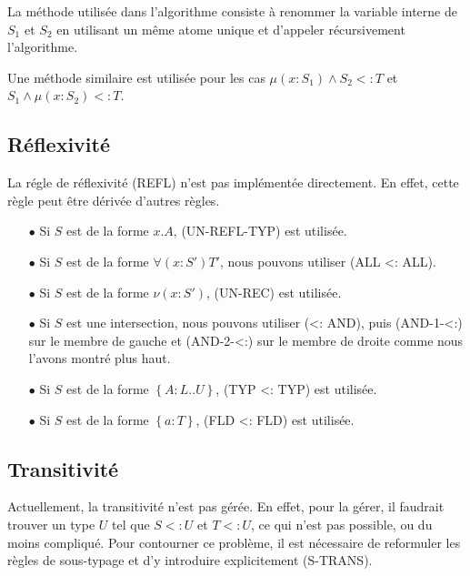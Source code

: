 La méthode utilisée dans l'algorithme consiste à renommer la variable interne de
$S_{1}$ et $S_{2}$ en utilisant un même atome unique et d'appeler récursivement l'algorithme.

Une méthode similaire est utilisée pour les cas $\mu(x : S_{1}) \wedge S_{2} <:
T$ et $S_{1} \wedge \mu(x : S_{2}) <: T$.

\subsection*{Réflexivité}

La régle de réflexivité (REFL) n'est pas implémentée directement. En effet,
cette règle peut être dérivée d'autres règles.

\begin{itemize}
  \item[$\bullet$] Si $S$ est de la forme $x.A$, (UN-REFL-TYP) est utilisée.
  \item[$\bullet$] Si $S$ est de la forme $\forall(x : S') T'$, nous pouvons utiliser (ALL
    <: ALL).
  \item[$\bullet$] Si $S$ est de la forme $\nu(x : S')$, (UN-REC) est utilisée.
  \item[$\bullet$] Si $S$ est une intersection, nous pouvons utiliser (<: AND), puis
    (AND-1-<:) sur le membre de gauche et (AND-2-<:) sur le membre de droite
    comme nous l'avons montré plus haut.
  \item[$\bullet$] Si $S$ est de la forme $\left\{ A : L .. U \right\}$, (TYP <: TYP) est utilisée.
  \item[$\bullet$] Si $S$ est de la forme $\left\{ a : T \right\}$, (FLD <: FLD) est utilisée.
\end{itemize}

\subsection*{Transitivité}

Actuellement, la transitivité n'est pas gérée. En effet, pour la gérer, il
faudrait trouver un type $U$ tel que $S <: U$ et $T <: U$, ce qui n'est pas
possible, ou du moins compliqué. Pour contourner ce problème, il est
nécessaire de reformuler les règles de sous-typage et d'y introduire
explicitement (S-TRANS).

